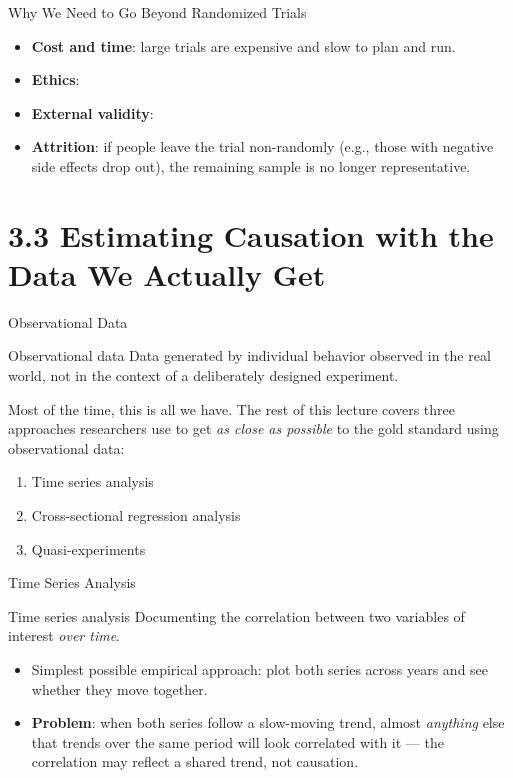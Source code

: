 \documentclass[11pt,aspectratio=169]{beamer}
\begin{document}
\begin{frame}{Why We Need to Go Beyond Randomized Trials}
  \begin{itemize}
    \item \textbf{Cost and time}: large trials are expensive and slow to plan and run.
    \item \textbf{Ethics}: 
    \item \textbf{External validity}:
    \item \textbf{Attrition}: if people leave the trial non-randomly (e.g., those with negative side effects drop out), the remaining sample is no longer representative.
  \end{itemize}

\end{frame}

\section{3.3 Estimating Causation with the Data We Actually Get}

\begin{frame}{Observational Data}
  \begin{block}{Observational data}
    Data generated by individual behavior observed in the real world, not in the context of a deliberately designed experiment.
  \end{block}
  \vspace{0.5em}
  Most of the time, this is all we have. The rest of this lecture covers three approaches researchers use to get \emph{as close as possible} to the gold standard using observational data:
  \begin{enumerate}
    \item Time series analysis
    \item Cross-sectional regression analysis
    \item Quasi-experiments  
  \end{enumerate}
\end{frame}

\begin{frame}{Time Series Analysis}
  \begin{block}{Time series analysis}
    Documenting the correlation between two variables of interest \emph{over time}.
  \end{block}
  \vspace{0.5em}
  \begin{itemize}
    \item Simplest possible empirical approach: plot both series across years and see whether they move together.
    \item \textbf{Problem}: when both series follow a slow-moving trend, almost \emph{anything} else that trends over the same period will look correlated with it --- the correlation may reflect a shared trend, not causation.
  \end{itemize}
\end{frame}
\end{document}
